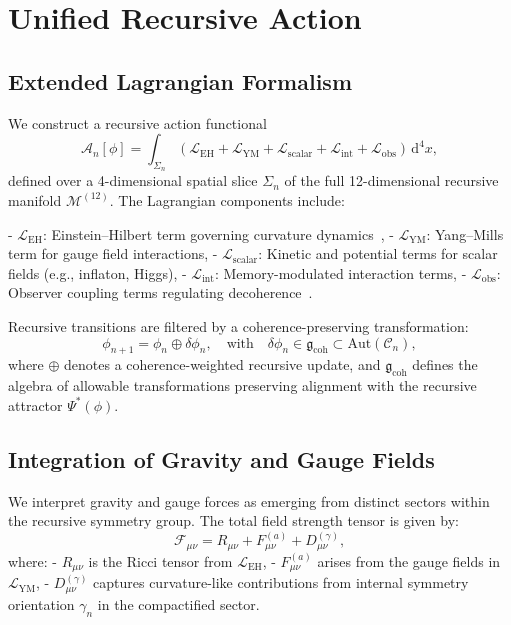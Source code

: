 \section{Unified Recursive Action}

\subsection{Extended Lagrangian Formalism}

We construct a recursive action functional
\[
\mathcal{A}_n[\phi] = \int_{\Sigma_n} \left( \mathcal{L}_{\text{EH}} + \mathcal{L}_{\text{YM}} + \mathcal{L}_{\text{scalar}} + \mathcal{L}_{\text{int}} + \mathcal{L}_{\text{obs}} \right) \, \mathrm{d}^4 x,
\]
defined over a 4-dimensional spatial slice $\Sigma_n$ of the full 12-dimensional recursive manifold $\mathcal{M}^{(12)}$. The Lagrangian components include:

- $\mathcal{L}_{\text{EH}}$: Einstein–Hilbert term governing curvature dynamics~\cite{peskin1995introduction},
- $\mathcal{L}_{\text{YM}}$: Yang–Mills term for gauge field interactions,
- $\mathcal{L}_{\text{scalar}}$: Kinetic and potential terms for scalar fields (e.g., inflaton, Higgs),
- $\mathcal{L}_{\text{int}}$: Memory-modulated interaction terms,
- $\mathcal{L}_{\text{obs}}$: Observer coupling terms regulating decoherence~\cite{zurek2003decoherence, nielsen2010quantum}.

Recursive transitions are filtered by a coherence-preserving transformation:
\[
\phi_{n+1} = \phi_n \oplus \delta \phi_n,
\quad \text{with} \quad \delta \phi_n \in \mathfrak{g}_{\text{coh}} \subset \mathrm{Aut}(\mathcal{C}_n),
\]
where $\oplus$ denotes a coherence-weighted recursive update, and $\mathfrak{g}_{\text{coh}}$ defines the algebra of allowable transformations preserving alignment with the recursive attractor $\Psi^*(\phi)$.

\subsection{Integration of Gravity and Gauge Fields}

We interpret gravity and gauge forces as emerging from distinct sectors within the recursive symmetry group. The total field strength tensor is given by:
\[
\mathcal{F}_{\mu\nu} = R_{\mu\nu} + F_{\mu\nu}^{(a)} + D_{\mu\nu}^{(\gamma)},
\]
where:
- $R_{\mu\nu}$ is the Ricci tensor from $\mathcal{L}_{\text{EH}}$,
- $F_{\mu\nu}^{(a)}$ arises from the gauge fields in $\mathcal{L}_{\text{YM}}$,
- $D_{\mu\nu}^{(\gamma)}$ captures curvature-like contributions from internal symmetry orientation $\gamma_n$ in the compactified sector.

